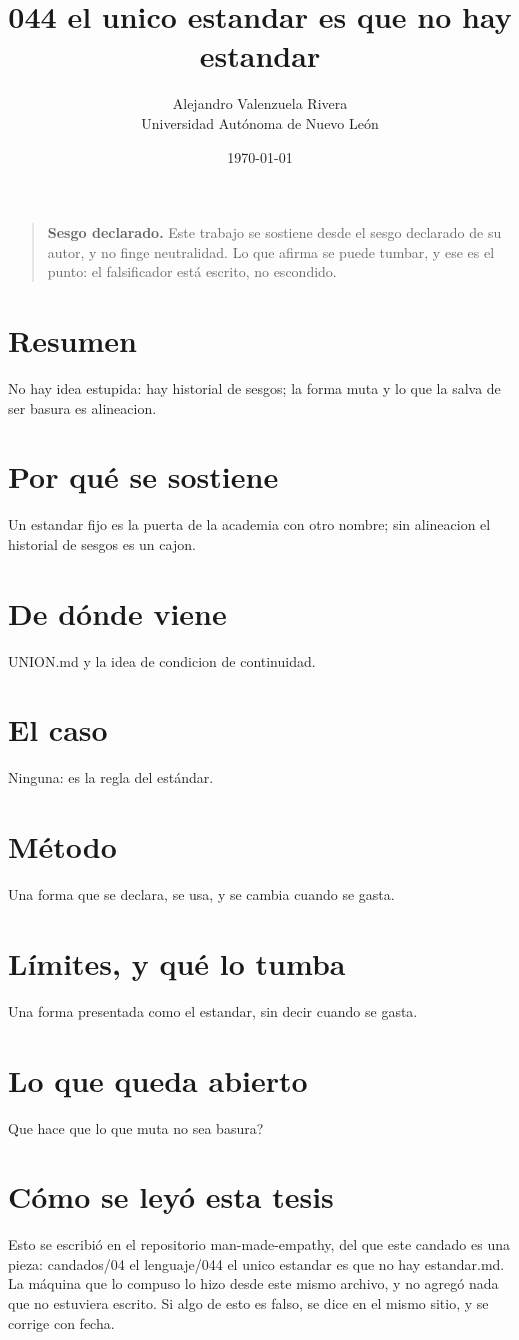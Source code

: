 \documentclass[11pt,a4paper]{article}
\title{044 el unico estandar es que no hay estandar}
\author{Alejandro Valenzuela Rivera\\\small Universidad Autónoma de Nuevo León}
\date{\today}
\begin{document}
\maketitle

\begin{quote}
\textbf{Sesgo declarado.} Este trabajo se sostiene desde el sesgo declarado de su autor, y no finge neutralidad. Lo que afirma se puede tumbar, y ese es el punto: el falsificador está escrito, no escondido.
\end{quote}

\section*{Resumen}
No hay idea estupida: hay historial de sesgos; la forma muta y lo que la salva de ser basura es alineacion.

\section{Por qué se sostiene}
Un estandar fijo es la puerta de la academia con otro nombre; sin alineacion el historial de sesgos es un cajon.

\section{De dónde viene}
UNION.md y la idea de condicion de continuidad.

\section{El caso}
Ninguna: es la regla del estándar.

\section{Método}
Una forma que se declara, se usa, y se cambia cuando se gasta.

\section{Límites, y qué lo tumba}
Una forma presentada como el estandar, sin decir cuando se gasta.

\section{Lo que queda abierto}
\textquestiondown{}Que hace que lo que muta no sea basura?

\section*{Cómo se leyó esta tesis}
Esto se escribió en el repositorio man-made-empathy, del que este candado es una pieza: candados/04 el lenguaje/044 el unico estandar es que no hay estandar.md. La máquina que lo compuso lo hizo desde este mismo archivo, y no agregó nada que no estuviera escrito. Si algo de esto es falso, se dice en el mismo sitio, y se corrige con fecha.
\end{document}
